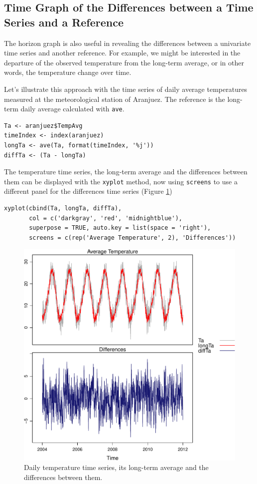 \subsection{Time Graph of the Differences between a Time Series and a Reference \label{sec:differences}}
\label{sec:org11d40b0}

The horizon graph is also useful in revealing the differences between
a univariate time series and another reference. For example, we
might be interested in the departure of the observed temperature
from the long-term average, or in other words, the temperature
change over time.

Let's illustrate this approach with the time series of daily
average temperatures measured at the meteorological station of
Aranjuez. The reference is the long-term daily average calculated
with \texttt{ave}.

\lstset{language=r,label= ,caption= ,captionpos=b,numbers=none}
\begin{lstlisting}
Ta <- aranjuez$TempAvg
timeIndex <- index(aranjuez)
longTa <- ave(Ta, format(timeIndex, '%j'))
diffTa <- (Ta - longTa)
\end{lstlisting}


The temperature time series, the long-term average and the
differences between them can be displayed with the \texttt{xyplot}
method, now using \texttt{screens} to use a different panel for the
differences time series (Figure \ref{fig:diffTa_xyplot})
\lstset{language=r,label= ,caption= ,captionpos=b,numbers=none}
\begin{lstlisting}
xyplot(cbind(Ta, longTa, diffTa),
       col = c('darkgray', 'red', 'midnightblue'),
       superpose = TRUE, auto.key = list(space = 'right'),
       screens = c(rep('Average Temperature', 2), 'Differences'))
\end{lstlisting}

\begin{figure}[htbp]
\centering
\includegraphics[width=.9\linewidth]{figs/diffTa_xyplot.pdf}
\caption{Daily temperature time series, its long-term average and the differences between them. \label{fig:diffTa_xyplot}}
\end{figure}

